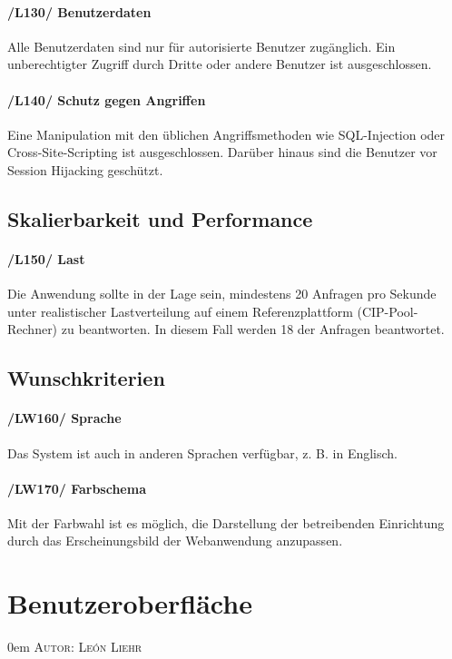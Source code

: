 \documentclass{article}
\makeatletter
\newcommand{\sectionauthor}[1]{
	{\parindent 0em \large \scshape Autor: #1 \par \nobreak \vspace*{2em}}
	\@afterheading
}
\makeatother
\begin{document}
    \paragraph{/L130/ \label{L130} Benutzerdaten}
   Alle Benutzerdaten sind nur für autorisierte Benutzer zugänglich.
Ein unberechtigter Zugriff durch Dritte oder andere Benutzer ist ausgeschlossen.

    \paragraph{/L140/ \label{L140} Schutz gegen Angriffen} 
   Eine Manipulation mit den üblichen Angriffsmethoden wie SQL-Injection oder Cross-Site-Scripting ist ausgeschlossen. Darüber hinaus sind die Benutzer vor Session Hijacking geschützt.
   
 \subsection{Skalierbarkeit und Performance}
	        \paragraph{
	        /L150/ \label{L150} Last}
	       Die Anwendung sollte in der Lage sein, mindestens 20 Anfragen pro Sekunde unter realistischer Lastverteilung auf einem Referenzplattform (CIP-Pool-Rechner) zu beantworten. In diesem Fall werden 18 der Anfragen beantwortet.
	       
	
\subsection{Wunschkriterien}
	    \paragraph{/LW160/ \label{LW160} Sprache}
	    Das System ist auch in anderen Sprachen verfügbar, z. B. in Englisch.
	    
\paragraph{/LW170/ \label{LW170} Farbschema}	    	       
	       Mit der Farbwahl ist es möglich, die Darstellung der betreibenden Einrichtung durch das Erscheinungsbild der Webanwendung anzupassen.

\section{Benutzeroberfläche} %
\sectionauthor{León Liehr}
\end{document}
